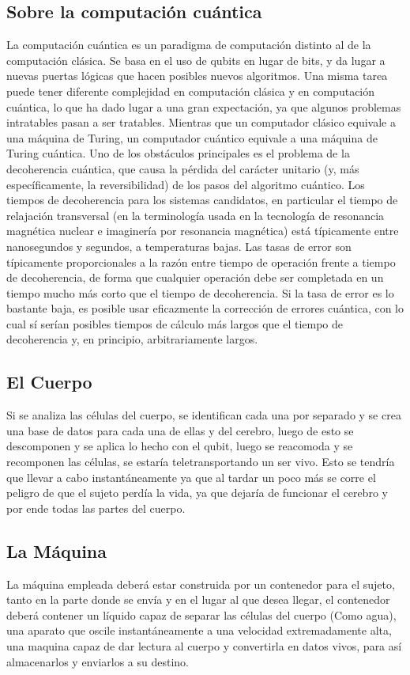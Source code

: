 \documentclass{bmcart}
\begin{document}
\subsection*{Sobre la computación cuántica}
La computación cuántica es un paradigma de computación distinto al de la computación clásica. Se basa en el uso de qubits en lugar de bits, y da lugar a nuevas puertas lógicas que hacen posibles nuevos algoritmos.
Una misma tarea puede tener diferente complejidad en computación clásica y en computación cuántica, lo que ha dado lugar a una gran expectación, ya que algunos problemas intratables pasan a ser tratables. Mientras que un computador clásico equivale a una máquina de Turing, un computador cuántico equivale a una máquina de Turing cuántica.
Uno de los obstáculos principales es el problema de la decoherencia cuántica, que causa la pérdida del carácter unitario (y, más específicamente, la reversibilidad) de los pasos del algoritmo cuántico. Los tiempos de decoherencia para los sistemas candidatos, en particular el tiempo de relajación transversal (en la terminología usada en la tecnología de resonancia magnética nuclear e imaginería por resonancia magnética) está típicamente entre nanosegundos y segundos, a temperaturas bajas. Las tasas de error son típicamente proporcionales a la razón entre tiempo de operación frente a tiempo de decoherencia, de forma que cualquier operación debe ser completada en un tiempo mucho más corto que el tiempo de decoherencia. Si la tasa de error es lo bastante baja, es posible usar eficazmente la corrección de errores cuántica, con lo cual sí serían posibles tiempos de cálculo más largos que el tiempo de decoherencia y, en principio, arbitrariamente largos.
\subsection*{El Cuerpo}
Si se analiza las células del cuerpo, se identifican cada una por separado y se crea una base de datos para cada una de ellas y del cerebro, luego de esto se descomponen y se aplica lo hecho con el qubit, luego se reacomoda y se recomponen las células, se estaría teletransportando un ser vivo. Esto se tendría que llevar a cabo instantáneamente ya que al tardar un poco más se corre el peligro de que el sujeto perdía la vida, ya que dejaría de funcionar el cerebro y por ende todas las partes del cuerpo.
\subsection*{La Máquina}
La máquina empleada deberá estar construida por un contenedor para el sujeto, tanto en la parte donde se envía y en el lugar al que desea llegar, el contenedor deberá contener un líquido capaz de separar las células del cuerpo (Como agua), una aparato que oscile instantáneamente a una velocidad extremadamente alta, una maquina capaz de dar lectura al cuerpo y convertirla en datos vivos, para así almacenarlos y enviarlos a su destino.
\end{document}
